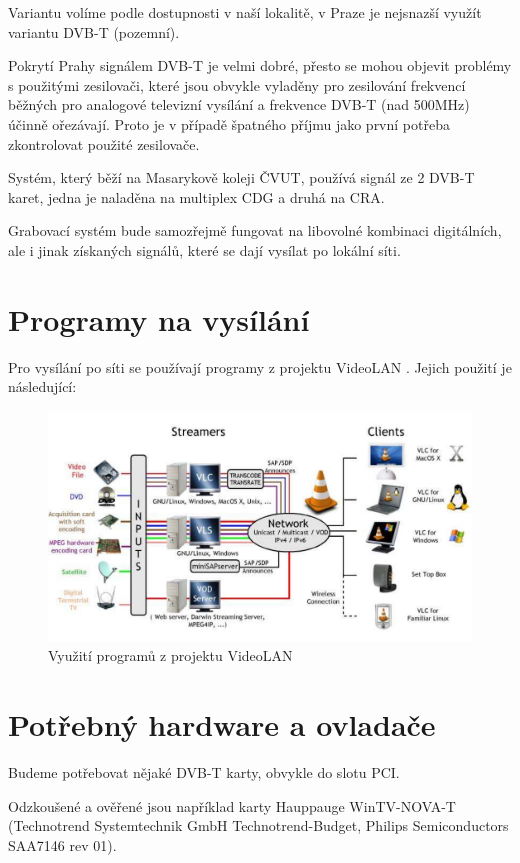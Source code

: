 Variantu volíme podle dostupnosti v naší lokalitě, v Praze je nejsnazší využít variantu DVB-T (pozemní).

Pokrytí Prahy signálem DVB-T je velmi dobré, přesto se mohou objevit problémy s použitými zesilovači, které jsou obvykle vyladěny pro zesilování frekvencí běžných pro analogové televizní vysílání a frekvence DVB-T (nad 500MHz) účinně ořezávají. Proto je v případě špatného příjmu jako první potřeba zkontrolovat použité zesilovače.

Systém, který běží na Masarykově koleji ČVUT, používá signál ze 2 DVB-T karet, jedna je naladěna na multiplex CDG a druhá na CRA. 

Grabovací systém bude samozřejmě fungovat na libovolné kombinaci digitálních, ale i jinak získaných signálů, které se dají vysílat po lokální síti.

\section{Programy na vysílání}
Pro vysílání po síti se používají programy z projektu VideoLAN \cite{videolanURL}. Jejich použití je následující:

\begin{figure}[ht]
\begin{center}
\includegraphics[width=15cm]{images/videolan}
\caption{Využití programů z projektu VideoLAN}
\label{fig:videolan}
\end{center}
\end{figure}

\section{Potřebný hardware a ovladače}
Budeme potřebovat nějaké DVB-T karty, obvykle do slotu PCI.

Odzkoušené a ověřené jsou například karty Hauppauge WinTV-NOVA-T (Technotrend Systemtechnik GmbH Technotrend-Budget, Philips Semiconductors SAA7146 rev 01).

